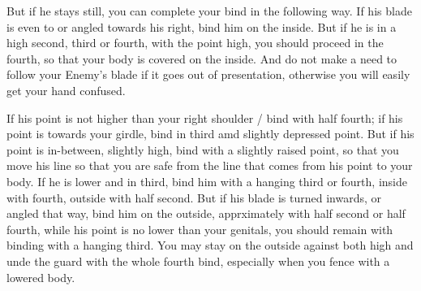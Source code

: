 \newpage


\newpage



But if he stays still, you can complete your bind in the following
way. If his blade is even to or angled towards his right, bind him on
the inside. But if he is in a high second, third or fourth, with the
point high, you should proceed in the fourth, so that your body is
covered on the inside. And do not make a need to follow your Enemy's
blade if it goes out of presentation, otherwise you will easily get
your hand confused.


If his point is not higher than your right shoulder / bind with half
fourth; if his point is towards your girdle, bind in third amd
slightly depressed point. But if his point is in-between, slightly
high, bind with a slightly raised point, so that you move his line so
that you are safe from the line that comes from his point to your
body. If he is lower and in third, bind him with a hanging third or
fourth, inside with fourth, outside with half second. But if his blade
is turned inwards, or angled that way, bind him on the outside,
apprximately with half second or half fourth, while his point is no
lower than your genitals, you should remain with binding with a
hanging third. You may stay on the outside against both high and unde
the guard with the whole fourth bind, especially when you fence with a
lowered body.

